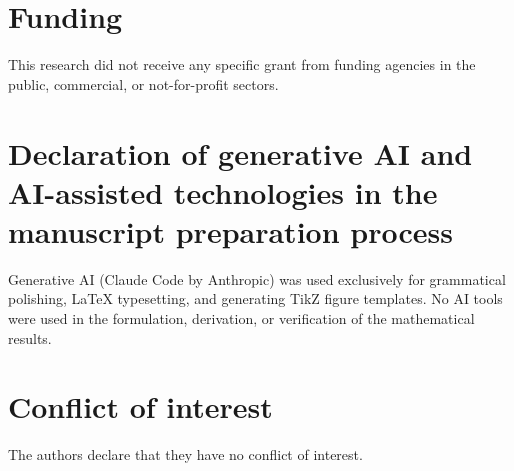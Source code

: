 \documentclass[11pt,reqno]{amsart}
\theoremstyle{definition}
\theoremstyle{plain}
\theoremstyle{definition}
\begin{document}
\section*{Funding}
This research did not receive any specific grant from funding agencies in the public, commercial,
or not-for-profit sectors.

\section*{Declaration of generative AI and AI-assisted technologies in the manuscript preparation process}
Generative AI (Claude Code by Anthropic) was used exclusively for grammatical polishing, LaTeX typesetting,
and generating TikZ figure templates. No AI tools were used in the formulation, derivation, or verification
of the mathematical results.

\section*{Conflict of interest}
The authors declare that they have no conflict of interest.



\end{document}
